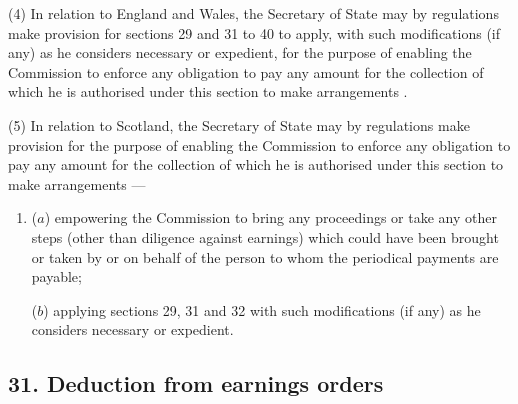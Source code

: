 \documentclass[12pt,a4paper]{article}
\begin{document}
(4) In relation to England and Wales, the Secretary of State may by regulations make provision for sections 29 and 31 to 40 to apply, with such modifications (if any) as he considers necessary or expedient, for the purpose of enabling 
the Commission  %
to enforce any obligation to pay any amount 
for the collection of which he is authorised under this section to make arrangements%
.

(5) In relation to Scotland, the Secretary of State may by regulations make provision for the purpose of enabling 
the Commission  %
to enforce any obligation to pay any amount 
for the collection of which he is authorised under this section to make arrangements%
—
\begin{enumerate}\item[]
($a$) empowering 
the Commission  %
to bring any proceedings or take any other steps (other than diligence against earnings) which could have been brought or taken by or on behalf of the person to whom the periodical payments are payable;

($b$) applying sections 29, 31 and 32 with such modifications (if any) as he considers necessary or expedient.
\end{enumerate}


\subsection{31. Deduction from earnings orders}
\end{document}
